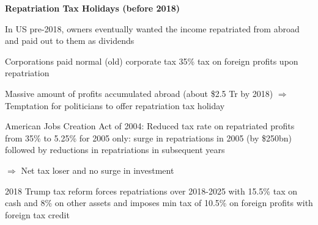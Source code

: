 \documentclass[landscape]{slides}
\begin{document}
\begin{slide}
\begin{center}
{\bf Repatriation Tax Holidays (before 2018)}
\end{center}
\vspace{-0.5cm}

In US pre-2018, owners eventually wanted the income repatriated from abroad and paid out to them as dividends

Corporations paid normal (old) corporate tax  35\% tax on foreign profits upon repatriation

Massive amount of profits accumulated abroad (about \$2.5 Tr by 2018) $\Rightarrow$ Temptation for politicians to offer repatriation tax holiday

\small
American Jobs Creation Act of 2004: Reduced tax rate on repatriated profits from 35\% to 5.25\% for 2005 only: surge in repatriations in 2005 (by \$250bn) followed by reductions in repatriations in subsequent years 

$\Rightarrow$ Net tax loser and no surge in investment
\normalsize


2018 Trump tax reform forces repatriations over 2018-2025 with 15.5\% tax on cash and 8\% on other assets and imposes min tax of 10.5\% on foreign profits with foreign tax credit


\end{slide}


\begin{slide}

\end{slide}


%
%
%
%
%
%
%
%
\end{document}
